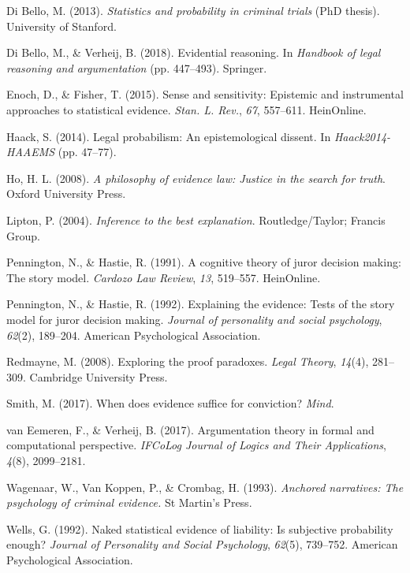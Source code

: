 \documentclass[11pt,dvipsnames,enabledeprecatedfontcommands]{scrartcl}
\begin{document}
\hypertarget{ref-di2013statistics}{}
Di Bello, M. (2013). \emph{Statistics and probability in criminal
trials} (PhD thesis). University of Stanford.

\hypertarget{ref-di2018evidential}{}
Di Bello, M., \& Verheij, B. (2018). Evidential reasoning. In
\emph{Handbook of legal reasoning and argumentation} (pp. 447--493).
Springer.

\hypertarget{ref-enoch2015sense}{}
Enoch, D., \& Fisher, T. (2015). Sense and sensitivity: Epistemic and
instrumental approaches to statistical evidence. \emph{Stan. L. Rev.},
\emph{67}, 557--611. HeinOnline.

\hypertarget{ref-haack2011legal}{}
Haack, S. (2014). Legal probabilism: An epistemological dissent. In
\emph{Haack2014-HAAEMS} (pp. 47--77).

\hypertarget{ref-ho2008philosophy}{}
Ho, H. L. (2008). \emph{A philosophy of evidence law: Justice in the
search for truth}. Oxford University Press.

\hypertarget{ref-Lipton2004-LIPITT}{}
Lipton, P. (2004). \emph{Inference to the best explanation}.
Routledge/Taylor; Francis Group.

\hypertarget{ref-pennington1991cognitive}{}
Pennington, N., \& Hastie, R. (1991). A cognitive theory of juror
decision making: The story model. \emph{Cardozo Law Review}, \emph{13},
519--557. HeinOnline.

\hypertarget{ref-pennington1992explaining}{}
Pennington, N., \& Hastie, R. (1992). Explaining the evidence: Tests of
the story model for juror decision making. \emph{Journal of personality
and social psychology}, \emph{62}(2), 189--204. American Psychological
Association.

\hypertarget{ref-redmayne2008exploring}{}
Redmayne, M. (2008). Exploring the proof paradoxes. \emph{Legal Theory},
\emph{14}(4), 281--309. Cambridge University Press.

\hypertarget{ref-Smith_conviction_mind_2017}{}
Smith, M. (2017). When does evidence suffice for conviction?
\emph{Mind}.

\hypertarget{ref-vanEemeren2017}{}
van Eemeren, F., \& Verheij, B. (2017). Argumentation theory in formal
and computational perspective. \emph{IFCoLog Journal of Logics and Their
Applications}, \emph{4}(8), 2099--2181.

\hypertarget{ref-wagenaar1993anchored}{}
Wagenaar, W., Van Koppen, P., \& Crombag, H. (1993). \emph{Anchored
narratives: The psychology of criminal evidence.} St Martin's Press.

\hypertarget{ref-wells1992naked}{}
Wells, G. (1992). Naked statistical evidence of liability: Is subjective
probability enough? \emph{Journal of Personality and Social Psychology},
\emph{62}(5), 739--752. American Psychological Association.
\end{document}
